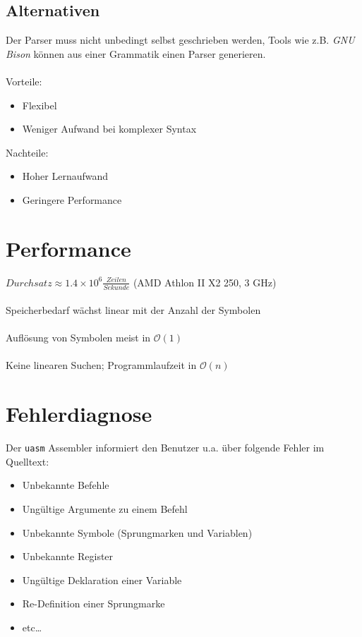 \subsection{Alternativen}

\begin{frame}{\insertsection}{\insertsubsection}
    Der Parser muss nicht unbedingt selbst geschrieben werden,
    Tools wie z.B. \textit{GNU Bison} können aus einer Grammatik einen
    Parser generieren.\\~\\
    Vorteile:
    \begin{itemize}
        \item Flexibel
        \item Weniger Aufwand bei komplexer Syntax
    \end{itemize}
    Nachteile:
    \begin{itemize}
        \item Hoher Lernaufwand
        \item Geringere Performance
    \end{itemize}
\end{frame}

\section{Performance}

\begin{frame}[fragile]{\insertsection}
    $Durchsatz \approx 1.4 \times 10^6 \frac{Zeilen}{Sekunde}$
    (AMD Athlon II X2 250, 3 GHz) \\~\\
    Speicherbedarf wächst linear mit der Anzahl der Symbolen \\~\\
    Auflösung von Symbolen meist in $\mathcal{O}(1)$ \\~\\
    Keine linearen Suchen; Programmlaufzeit in $\mathcal{O}(n)$
\end{frame}

\section{Fehlerdiagnose}

\begin{frame}{\insertsection}
    Der \texttt{uasm} Assembler informiert den Benutzer u.a. über folgende
    Fehler im Quelltext:
    \begin{itemize}
        \item Unbekannte Befehle
        \item Ungültige Argumente zu einem Befehl
        \item Unbekannte Symbole (Sprungmarken und Variablen)
        \item Unbekannte Register
        \item Ungültige Deklaration einer Variable
        \item Re-Definition einer Sprungmarke
        \item etc\ldots{}
    \end{itemize}
\end{frame}

